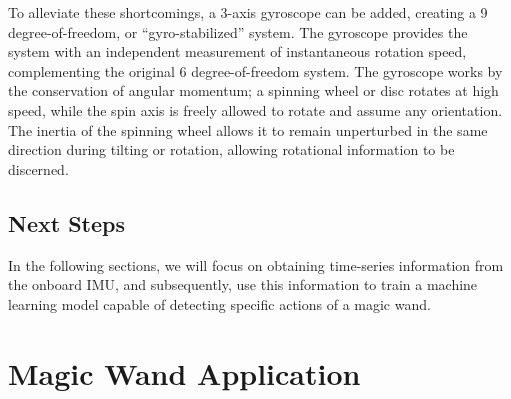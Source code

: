     To alleviate these shortcomings, a 3-axis gyroscope can be added, creating a 9 degree-of-freedom, or “gyro-stabilized” system. The gyroscope provides the system with an independent measurement of instantaneous rotation speed, complementing the original 6 degree-of-freedom system. The gyroscope works by the conservation of angular momentum; a spinning wheel or disc rotates at high speed, while the spin axis is freely allowed to rotate and assume any orientation. The inertia of the spinning wheel allows it to remain unperturbed in the same direction during tilting or rotation, allowing rotational information to be discerned.
    
\subsection{Next Steps}
    In the following sections, we will focus on obtaining time-series information from the onboard IMU, and subsequently, use this information to train a machine learning model capable of detecting specific actions of a magic wand.
    
\section{Magic Wand Application}

